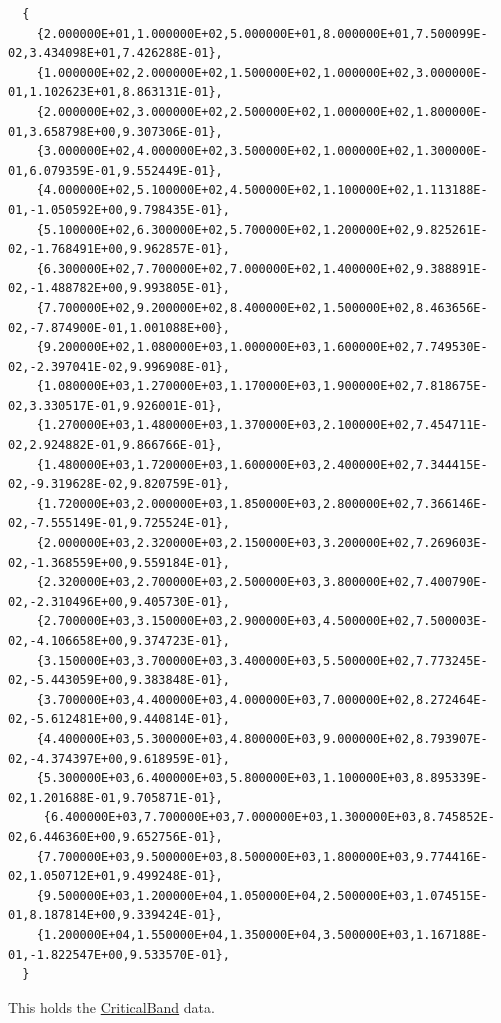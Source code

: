 \footnotesize\begin{verbatim} 
  {
    {2.000000E+01,1.000000E+02,5.000000E+01,8.000000E+01,7.500099E-02,3.434098E+01,7.426288E-01},
    {1.000000E+02,2.000000E+02,1.500000E+02,1.000000E+02,3.000000E-01,1.102623E+01,8.863131E-01},
    {2.000000E+02,3.000000E+02,2.500000E+02,1.000000E+02,1.800000E-01,3.658798E+00,9.307306E-01},
    {3.000000E+02,4.000000E+02,3.500000E+02,1.000000E+02,1.300000E-01,6.079359E-01,9.552449E-01},
    {4.000000E+02,5.100000E+02,4.500000E+02,1.100000E+02,1.113188E-01,-1.050592E+00,9.798435E-01},
    {5.100000E+02,6.300000E+02,5.700000E+02,1.200000E+02,9.825261E-02,-1.768491E+00,9.962857E-01},
    {6.300000E+02,7.700000E+02,7.000000E+02,1.400000E+02,9.388891E-02,-1.488782E+00,9.993805E-01},
    {7.700000E+02,9.200000E+02,8.400000E+02,1.500000E+02,8.463656E-02,-7.874900E-01,1.001088E+00},
    {9.200000E+02,1.080000E+03,1.000000E+03,1.600000E+02,7.749530E-02,-2.397041E-02,9.996908E-01},
    {1.080000E+03,1.270000E+03,1.170000E+03,1.900000E+02,7.818675E-02,3.330517E-01,9.926001E-01},
    {1.270000E+03,1.480000E+03,1.370000E+03,2.100000E+02,7.454711E-02,2.924882E-01,9.866766E-01},
    {1.480000E+03,1.720000E+03,1.600000E+03,2.400000E+02,7.344415E-02,-9.319628E-02,9.820759E-01},
    {1.720000E+03,2.000000E+03,1.850000E+03,2.800000E+02,7.366146E-02,-7.555149E-01,9.725524E-01},
    {2.000000E+03,2.320000E+03,2.150000E+03,3.200000E+02,7.269603E-02,-1.368559E+00,9.559184E-01},
    {2.320000E+03,2.700000E+03,2.500000E+03,3.800000E+02,7.400790E-02,-2.310496E+00,9.405730E-01},
    {2.700000E+03,3.150000E+03,2.900000E+03,4.500000E+02,7.500003E-02,-4.106658E+00,9.374723E-01},
    {3.150000E+03,3.700000E+03,3.400000E+03,5.500000E+02,7.773245E-02,-5.443059E+00,9.383848E-01},
    {3.700000E+03,4.400000E+03,4.000000E+03,7.000000E+02,8.272464E-02,-5.612481E+00,9.440814E-01},
    {4.400000E+03,5.300000E+03,4.800000E+03,9.000000E+02,8.793907E-02,-4.374397E+00,9.618959E-01},
    {5.300000E+03,6.400000E+03,5.800000E+03,1.100000E+03,8.895339E-02,1.201688E-01,9.705871E-01},
     {6.400000E+03,7.700000E+03,7.000000E+03,1.300000E+03,8.745852E-02,6.446360E+00,9.652756E-01},
    {7.700000E+03,9.500000E+03,8.500000E+03,1.800000E+03,9.774416E-02,1.050712E+01,9.499248E-01},
    {9.500000E+03,1.200000E+04,1.050000E+04,2.500000E+03,1.074515E-01,8.187814E+00,9.339424E-01},
    {1.200000E+04,1.550000E+04,1.350000E+04,3.500000E+03,1.167188E-01,-1.822547E+00,9.533570E-01},
  }
\end{verbatim}\normalsize 
This holds the \hyperlink{classLoudness_1_1CriticalBand}{Critical\-Band} data. 

